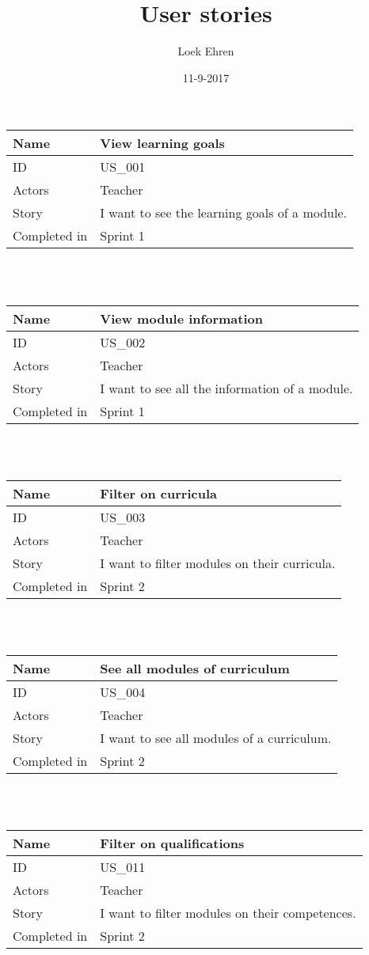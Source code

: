 \documentclass[12pt, a4paper]{article}
\author{Loek Ehren}
\title{\textbf{User stories}}
\date{11-9-2017}
\newcommand\addrow[2]{#1 &#2\\ }
\newcommand\tabularhead{\begin{tabular}{lp{8cm}}
		\hline
	}
\newenvironment{usecase}{\tabularhead}
	{\hline\end{tabular}}
\begin{document}
    \maketitle

    \begin{usecase}
    	\addrow{Name}{View learning goals}
    	\hline
    	\addrow{ID}{US\_001}
    	\hline
    	\addrow{Actors}{ Teacher }
    	\hline		
    	\addrow{Story}{I want to see the learning goals of a module.}
    	\hline
    	\addrow{Completed in}{Sprint 1}
    \end{usecase}
    
    ~\\
    ~\\
    
    \begin{usecase}
    	\addrow{Name}{View module information}
    	\hline
    	\addrow{ID}{US\_002}
    	\hline
    	\addrow{Actors}{ Teacher }
    	\hline		
    	\addrow{Story}{I want to see all the information of a module.}
    	    	\hline
    	\addrow{Completed in}{Sprint 1}
    \end{usecase}
    
    ~\\
    ~\\
    
    \begin{usecase}
	\addrow{Name}{Filter on curricula}
	\hline
	\addrow{ID}{US\_003}
	\hline
	\addrow{Actors}{ Teacher }
	\hline		
	\addrow{Story}{I want to filter modules on their curricula.}
	\hline
	\addrow{Completed in}{Sprint 2}
	\end{usecase}

	~\\
	~\\
	
	    \begin{usecase}
		\addrow{Name}{See all modules of curriculum}
		\hline
		\addrow{ID}{US\_004}
		\hline
		\addrow{Actors}{ Teacher }
		\hline		
		\addrow{Story}{I want to see all modules of a curriculum.}
		\hline
		\addrow{Completed in}{Sprint 2}
	\end{usecase}
	
	~\\
~\\

\begin{usecase}
	\addrow{Name}{Filter on qualifications}
	\hline
	\addrow{ID}{US\_011}
	\hline
	\addrow{Actors}{ Teacher }
	\hline		
	\addrow{Story}{I want to filter modules on their competences.}
	\hline
	\addrow{Completed in}{Sprint 2}
\end{usecase}
\end{document}
